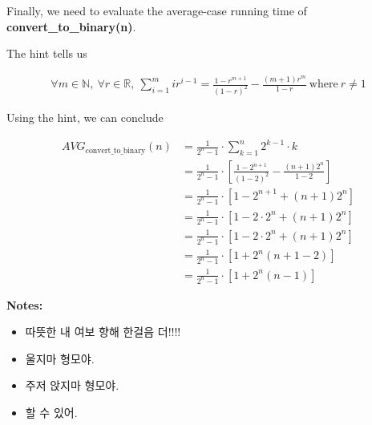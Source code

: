 \documentclass[12pt]{article}
\begin{document}
\begin{enumerate}[a.]
\begin{mdframed}
\begin{enumerate}[1.]
\begin{itemize}
\begin{mdframed}
            \end{mdframed}
        \end{itemize}

        \begin{mdframed}

            Finally, we need to evaluate the average-case running time of\\
            \textbf{convert\_to\_binary(n)}.

            \bigskip

            The hint tells us

            \begin{align}
                \forall m \in \mathbb{N},\:\forall r \in \mathbb{R},\:\sum\limits_{i=1}^m ir^{i-1} = \frac{1 - r^{m+1}}{(1-r)^2} - \frac{(m+1)r^m}{1-r}\:\text{where}\:r \neq 1
            \end{align}

            \bigskip

            Using the hint, we can conclude

            \begin{align}
                AVG_{\text{convert\_to\_binary}}(n) &= \frac{1}{2^n - 1} \cdot \sum\limits_{k = 1}^n 2^{k-1} \cdot k\\
                &= \frac{1}{2^n - 1} \cdot \left[ \frac{1 - 2^{n+1}}{(1-2)^2} - \frac{(n+1)2^n}{1-2} \right]\\
                &= \frac{1}{2^n - 1} \cdot \left[ 1 - 2^{n+1} + (n+1)2^n \right]\\
                &= \frac{1}{2^n - 1} \cdot \left[ 1 - 2 \cdot 2^n + (n+1)2^n \right]\\
                &= \frac{1}{2^n - 1} \cdot \left[ 1 - 2 \cdot 2^n + (n+1)2^n \right]\\
                &= \frac{1}{2^n - 1} \cdot \left[ 1 + 2^n(n+1 - 2) \right]\\
                &= \frac{1}{2^n - 1} \cdot \left[ 1 + 2^n(n-1) \right]
            \end{align}
        \end{mdframed}
    \end{enumerate}

    \end{mdframed}

    \bigskip

    \textbf{Notes:}

    \begin{itemize}
        \item 따뜻한 내 여보 향해 한걸음 더!!!!
        \item 울지마 형모야.
        \item 주저 앉지마 형모야.
        \item 할 수 있어.
    \end{itemize}

\end{enumerate}
\end{document}
